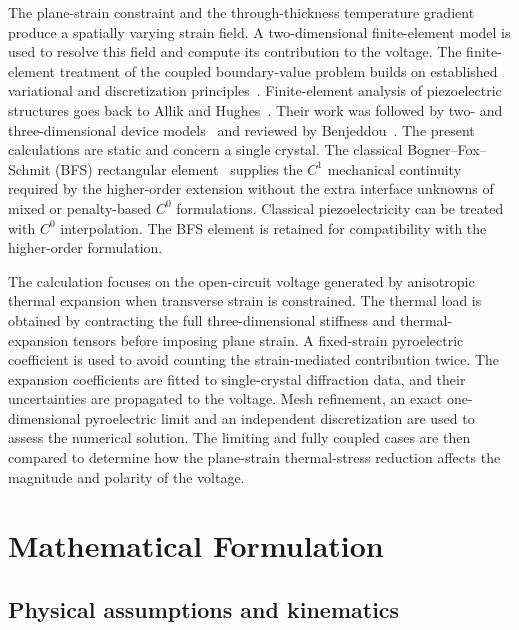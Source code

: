 \documentclass[a4paper,12pt]{elsarticle}
\begin{document}
The plane-strain constraint and the through-thickness temperature
gradient produce a spatially varying strain field. A two-dimensional
finite-element model is used to resolve this field and compute its
contribution to the voltage. The finite-element treatment of the coupled
boundary-value problem builds on established variational and
discretization principles~\cite{Bathe1996}. Finite-element analysis of
piezoelectric structures goes back to Allik and Hughes~\cite{AllikHughes1970}.
Their work was followed by two- and three-dimensional device
models~\cite{Lerch1990,Tzou1993} and reviewed by Benjeddou~\cite{Benjeddou2000a}.
The present calculations are static and concern a single crystal.
The classical Bogner--Fox--Schmit (BFS) rectangular
element~\cite{Bogner1965} supplies the $C^1$ mechanical continuity
required by the higher-order extension without the extra interface
unknowns of mixed or penalty-based $C^0$ formulations. Classical
piezoelectricity can be treated with $C^0$ interpolation. The BFS
element is retained for compatibility with the higher-order formulation.

The calculation focuses on the open-circuit voltage generated by
anisotropic thermal expansion when transverse strain is constrained.
The thermal load is obtained by contracting the full three-dimensional
stiffness and thermal-expansion tensors before imposing plane strain.
A fixed-strain pyroelectric coefficient is used to avoid counting the
strain-mediated contribution twice. The expansion coefficients are
fitted to single-crystal diffraction data, and their uncertainties
are propagated to the voltage. Mesh refinement, an exact
one-dimensional pyroelectric limit and an independent discretization
are used to assess the numerical solution. The limiting and fully
coupled cases are then compared to determine how the plane-strain
thermal-stress reduction affects the magnitude and polarity of the
voltage.

\section{Mathematical Formulation}
\label{sec:theory}

\subsection{Physical assumptions and kinematics}
\end{document}
